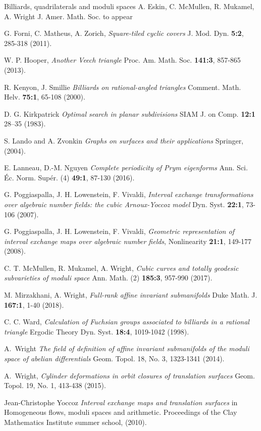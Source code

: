 \documentclass[a4paper,12pt]{article}
\begin{document}
\begin{thebibliography}{sage-flatsurf}
Billiards, quadrilaterals and moduli spaces
A. Eskin, C. McMullen, R. Mukamel, A. Wright
J. Amer. Math. Soc. to appear

G. Forni, C. Matheus, A. Zorich,
\textit{Square-tiled cyclic covers}
J. Mod. Dyn. \textbf{5:2}, 285-318 (2011).

W. P. Hooper,
\textit{Another Veech triangle}
Proc. Am. Math. Soc. \textbf{141:3}, 857-865 (2013).

R. Kenyon, J. Smillie
\textit{Billiards on rational-angled triangles}
Comment. Math. Helv. \textbf{75:1}, 65-108 (2000).

D. G. Kirkpatrick
\textit{Optimal search in planar subdivisions}
SIAM J. on Comp.
\textbf{12:1} 28–35 (1983).

S. Lando and A. Zvonkin
\textit{Graphs on surfaces and their applications}
Springer, (2004).

E. Lanneau, D.-M. Nguyen
\textit{Complete periodicity of Prym eigenforms}
Ann. Sci. Éc. Norm. Supér. (4) \textbf{49:1}, 87-130 (2016).

G. Poggiaspalla, J. H. Lowenstein, F. Vivaldi,
\textit{Interval exchange transformations over algebraic number fields: the cubic Arnoux-Yoccoz model}
Dyn. Syst. \textbf{22:1}, 73-106 (2007).

G. Poggiaspalla, J. H. Lowenstein, F. Vivaldi,
\textit{Geometric representation of interval exchange maps over algebraic number fields},
Nonlinearity \textbf{21:1}, 149-177 (2008).

C. T. McMullen, R. Mukamel, A. Wright,
\textit{Cubic curves and totally geodesic subvarieties of moduli space}
Ann. Math. (2) \textbf{185:3}, 957-990 (2017).

M. Mirzakhani, A. Wright,
\textit{Full-rank affine invariant submanifolds}
Duke Math. J. \textbf{167:1}, 1-40 (2018).

C. C. Ward,
\textit{Calculation of Fuchsian groups associated to billiards in a rational triangle}
Ergodic Theory Dyn. Syst. \textbf{18:4}, 1019-1042 (1998).

A.~Wright
\textit{The field of definition of affine invariant submanifolds of the moduli space of abelian differentials}
Geom. Topol. 18, No. 3, 1323-1341 (2014).

A.~Wright,
\textit{Cylinder deformations in orbit closures of translation surfaces}
Geom. Topol. 19, No. 1, 413-438 (2015).

Jean-Christophe Yoccoz
\textit{Interval exchange maps and translation surfaces}
in Homogeneous flows, moduli spaces and arithmetic.
Proceedings of the Clay Mathematics Institute summer school,
(2010).
\end{thebibliography}
\end{document}
